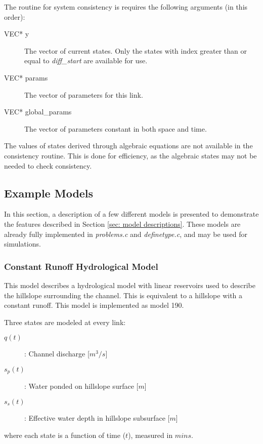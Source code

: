 \documentclass[12pt]{article}
\begin{document}
The routine for system consistency is requires the following arguments (in this order):
\begin{description}
 \item[VEC* y] The vector of current states. Only the states with index greater than or equal to \emph{diff\_start} are available for use.
 \item[VEC* params] The vector of parameters for this link.
 \item[VEC* global\_params] The vector of parameters constant in both space and time.
\end{description}

The values of states derived through algebraic equations are not available in the consistency routine. This is done for efficiency, as the algebraic states may not be needed to check consistency.


\subsection{Example Models} \label{sec: example models}

In this section, a description of a few different models is presented to demonstrate the features described in Section \ref{sec: model descriptions}. These models are already fully implemented in \emph{problems.c} and \emph{definetype.c}, and may be used for simulations.

\subsubsection{Constant Runoff Hydrological Model} \label{sec: constant runoff model}

This model describes a hydrological model with linear reservoirs used to describe the hillslope surrounding the channel. This is equivalent to a hillslope with a constant runoff. This model is implemented as model 190.

Three states are modeled at every link:
\begin{description}
 \item[$q(t)$]: Channel discharge [$m^3/s$]
 \item[$s_p(t)$]: Water ponded on hillslope surface [$m$]
 \item[$s_s(t)$]: Effective water depth in hillslope subsurface [$m$]
\end{description}
where each state is a function of time ($t$), measured in $mins$.
\end{document}
